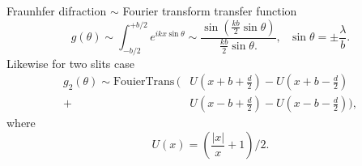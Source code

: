 Fraunhfer difraction $\sim$ Fourier transform transfer function
\begin{equation*}
        g(\theta) \sim 
        \int_{-b/2}^{+b/2} 
        e^{ik x \sin \theta} \sim \frac{
        \sin\left(
            \frac{kb}{2} \sin \theta
        \right)
        }{
        \frac{kb}{2} \sin \theta.
        },
        \ \ \
        \sin \theta = \pm \frac{\lambda}{b}.
\end{equation*}
Likewise for two slits case
\begin{align*}
        g_2(\theta) \sim \text{FouierTrans}\,\bigg(
            &U\left(x+b+\frac{d}{2}\right)-U\left(x+b-\frac{d}{2}\right) \\
             + &U\left(x-b+\frac{d}{2}\right)-U\left(x-b-\frac{d}{2}\right)
        \bigg),
\end{align*}
where
\begin{equation*}
    U(x) = \left(\frac{|x|}{x}+1\right)\bigg/2.
\end{equation*}


